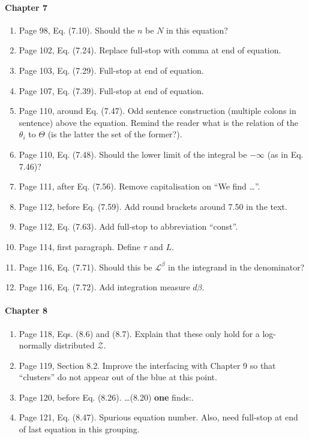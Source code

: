 \documentclass[11pt]{article}
\begin{document}
\paragraph{Chapter 7}
\begin{enumerate}
\item Page 98, Eq. (7.10). Should the $n$ be $N$ in this equation?
\item Page 102, Eq. (7.24). Replace full-stop with comma at end of
  equation.
\item Page 103, Eq. (7.29). Full-stop at end of equation.
\item Page 107, Eq. (7.39). Full-stop at end of equation.
\item Page 110, around Eq. (7.47). Odd sentence construction (multiple
  colons in sentence) above the equation. Remind the reader what is
  the relation of the $\theta_i$ to $\Theta$ (is the latter the set of
  the former?). 
\item Page 110, Eq. (7.48). Should the lower limit of the integral be
  $-\infty$ (as in Eq. 7.46)?
\item Page 111, after Eq. (7.56). Remove capitalisation on ``We find
  \ldots''.
\item Page 112, before Eq. (7.59). Add round brackets around 7.50 in
  the text.
\item Page 112, Eq. (7.63). Add full-stop to abbreviation ``const''.
\item Page 114, first paragraph. Define $\tau$ and $L$.
\item Page 116, Eq. (7.71). Should this be $\mathcal{L}^\beta$ in the
  integrand in the denominator?
\item Page 116, Eq. (7.72). Add integration measure $d\beta$.
\end{enumerate}

\paragraph{Chapter 8}
\begin{enumerate}
\item Page 118, Eqs. (8.6) and (8.7). Explain that these only hold for
  a log-normally distributed $\mathcal{Z}$.
\item Page 119, Section 8.2. Improve the interfacing with Chapter 9 so
  that ``clusters'' do not appear out of the blue at this point.
\item Page 120, before Eq. (8.26).  \ldots (8.20) \textbf{one} finds:.
\item Page 121, Eq. (8.47). Spurious equation number. Also, need
  full-stop at end of last equation in this grouping.
\end{enumerate}
\end{document}
